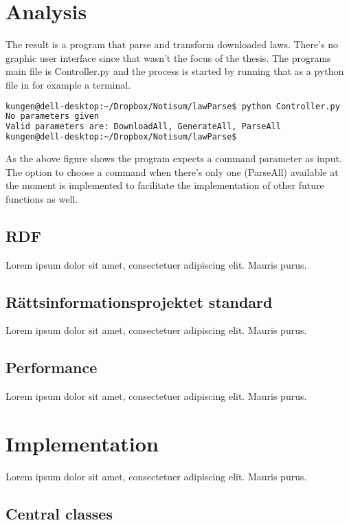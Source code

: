 \documentclass[a4paper,11pt]{kth-mag}
\begin{document}
\chapter{Analysis}

The result is a program that parse and transform downloaded laws. There’s no graphic user interface since that wasn’t the focus of the thesis. The programs main file is Controller.py and the process is started by running that as a python file in for example a terminal. 

\begin{lstlisting}[language=bash, caption=Command to run the program]
kungen@dell-desktop:~/Dropbox/Notisum/lawParse$ python Controller.py
No parameters given
Valid parameters are: DownloadAll, GenerateAll, ParseAll
kungen@dell-desktop:~/Dropbox/Notisum/lawParse$ 
\end{lstlisting}

As the above figure shows the program expects a command parameter as input. The option to choose a command when there’s only one (ParseAll) available at the moment is implemented to facilitate the implementation of other future functions as well. 

\section{RDF}

Lorem ipsum dolor sit amet, consectetuer adipiscing elit. Mauris
purus.

\section{Rättsinformationsprojektet standard}

Lorem ipsum dolor sit amet, consectetuer adipiscing elit. Mauris
purus.  

\section{Performance}

Lorem ipsum dolor sit amet, consectetuer adipiscing elit. Mauris
purus. 

\chapter{Implementation}

Lorem ipsum dolor sit amet, consectetuer adipiscing elit. Mauris
purus. 

\section{Central classes}
\end{document}
